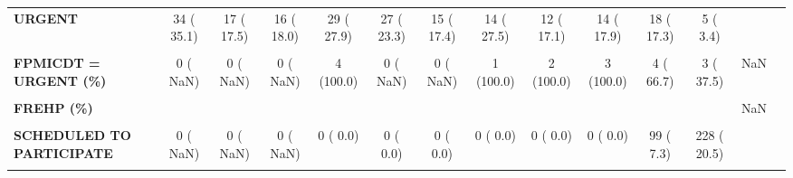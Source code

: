 \documentclass[
]{article}
\begin{document}
\begin{table}[H]
\begin{tabular}[t]{>{\raggedright\arraybackslash}p{5em}ccccccccccccc}
\textbf{URGENT} & 34 ( 35.1) & 17 ( 17.5) & 16 ( 18.0) & 29 ( 27.9) & 27 ( 23.3) & 15 ( 17.4) & 14 ( 27.5) & 12 ( 17.1) & 14 ( 17.9) & 18 ( 17.3) & 5 (  3.4) &  & \\
\textbf{\cellcolor{gray!10}{FPMICD = YES (\%)}} & \cellcolor{gray!10}{0 (  0.0)} & \cellcolor{gray!10}{0 (  0.0)} & \cellcolor{gray!10}{2 (  0.1)} & \cellcolor{gray!10}{6 (  0.3)} & \cellcolor{gray!10}{5 (  0.3)} & \cellcolor{gray!10}{1 (  0.1)} & \cellcolor{gray!10}{6 (  0.3)} & \cellcolor{gray!10}{3 (  0.2)} & \cellcolor{gray!10}{6 (  0.4)} & \cellcolor{gray!10}{6 (  0.4)} & \cellcolor{gray!10}{8 (  0.7)} & \cellcolor{gray!10}{0.004} & \cellcolor{gray!10}{}\\
\textbf{FPMICDT = URGENT (\%)} & 0 (  NaN) & 0 (  NaN) & 0 (  NaN) & 4 (100.0) & 0 (  NaN) & 0 (  NaN) & 1 (100.0) & 2 (100.0) & 3 (100.0) & 4 ( 66.7) & 3 ( 37.5) & NaN & \\
\textbf{\cellcolor{gray!10}{FREHOS = YES (\%)}} & \cellcolor{gray!10}{361 ( 21.3)} & \cellcolor{gray!10}{379 ( 19.2)} & \cellcolor{gray!10}{390 ( 19.3)} & \cellcolor{gray!10}{377 ( 20.1)} & \cellcolor{gray!10}{343 ( 21.0)} & \cellcolor{gray!10}{316 ( 19.8)} & \cellcolor{gray!10}{214 ( 15.4)} & \cellcolor{gray!10}{276 ( 16.9)} & \cellcolor{gray!10}{229 ( 16.4)} & \cellcolor{gray!10}{216 ( 14.9)} & \cellcolor{gray!10}{198 ( 17.5)} & \cellcolor{gray!10}{<0.001} & \cellcolor{gray!10}{}\\
\textbf{FREHP (\%)} &  &  &  &  &  &  &  &  &  &  &  & NaN & \\
\textbf{\cellcolor{gray!10}{NO}} & \cellcolor{gray!10}{0 (  NaN)} & \cellcolor{gray!10}{0 (  NaN)} & \cellcolor{gray!10}{0 (  NaN)} & \cellcolor{gray!10}{365 ( 58.1)} & \cellcolor{gray!10}{1358 ( 82.0)} & \cellcolor{gray!10}{1261 ( 84.0)} & \cellcolor{gray!10}{1069 ( 81.7)} & \cellcolor{gray!10}{1239 ( 82.6)} & \cellcolor{gray!10}{1076 ( 80.8)} & \cellcolor{gray!10}{878 ( 64.9)} & \cellcolor{gray!10}{664 ( 59.7)} & \cellcolor{gray!10}{} & \cellcolor{gray!10}{}\\
\textbf{SCHEDULED TO PARTICIPATE} & 0 (  NaN) & 0 (  NaN) & 0 (  NaN) & 0 (  0.0) & 0 (  0.0) & 0 (  0.0) & 0 (  0.0) & 0 (  0.0) & 0 (  0.0) & 99 (  7.3) & 228 ( 20.5) &  & \\
\textbf{\cellcolor{gray!10}{YES}} & \cellcolor{gray!10}{0 (  NaN)} & \cellcolor{gray!10}{0 (  NaN)} & \cellcolor{gray!10}{0 (  NaN)} & \cellcolor{gray!10}{263 ( 41.9)} & \cellcolor{gray!10}{298 ( 18.0)} & \cellcolor{gray!10}{240 ( 16.0)} & \cellcolor{gray!10}{239 ( 18.3)} & \cellcolor{gray!10}{261 ( 17.4)} & \cellcolor{gray!10}{255 ( 19.2)} & \cellcolor{gray!10}{375 ( 27.7)} & \cellcolor{gray!10}{221 ( 19.9)} & \cellcolor{gray!10}{} & \cellcolor{gray!10}{}\\

\end{tabular}
\end{table}
\end{document}
